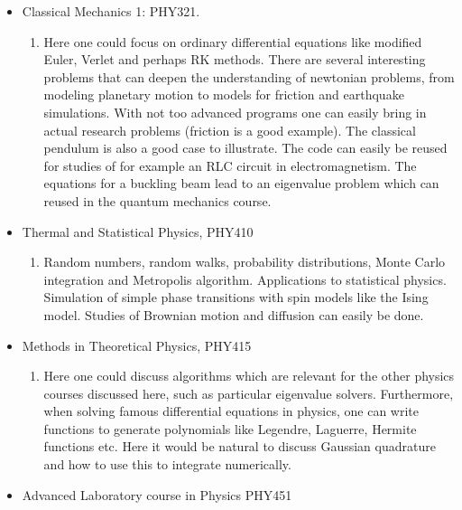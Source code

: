 \documentclass[%
oneside,                 %
final,                   %
10pt]{article}
\begin{document}
\begin{itemize}
 \item Classical Mechanics 1: PHY321. 
\begin{enumerate}

  \item Here one could focus on ordinary differential equations like modified Euler, Verlet and perhaps RK methods. There are several interesting problems that can deepen the understanding of newtonian problems, from modeling planetary motion to models for friction and earthquake simulations. With not too advanced programs one can easily bring in actual research problems (friction is a good example).  The classical pendulum is also a good case to illustrate. The code can easily be reused for studies of for example an RLC circuit in electromagnetism. The equations for a buckling beam lead to an eigenvalue problem which can reused in the quantum mechanics course.

\end{enumerate}

\noindent
 \item Thermal and Statistical Physics, PHY410
\begin{enumerate}

  \item Random numbers, random walks, probability distributions, Monte Carlo integration and Metropolis algorithm. Applications to statistical physics. Simulation of simple phase transitions with spin models like the Ising model.  Studies of Brownian motion and diffusion can easily be done.

\end{enumerate}

\noindent
 \item Methods in Theoretical Physics, PHY415
\begin{enumerate}

  \item Here one could discuss algorithms which are relevant for the other physics courses discussed here, such as particular eigenvalue solvers. Furthermore, when solving famous differential equations in physics, one can write functions to generate polynomials like Legendre, Laguerre, Hermite functions etc. Here it would be natural to discuss Gaussian quadrature and how to use this to integrate numerically. 

\end{enumerate}

\noindent
 \item Advanced Laboratory course in Physics PHY451
\begin{enumerate}


\end{enumerate}
\end{itemize}
\end{document}
